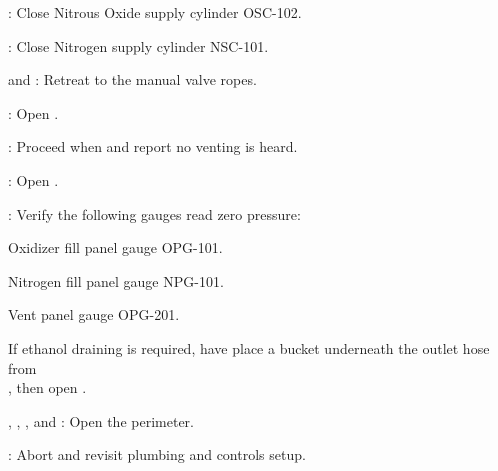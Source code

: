 \begin{checklist}
    \item \primary{}: Close Nitrous Oxide supply cylinder OSC-102. 
    \item \primary{}: Close Nitrogen supply cylinder NSC-101. 
    \item \primary{} and \secondary{}: Retreat to the manual valve ropes. 
    \item \primary{}: Open \moxfill{}.  
    \item \ops{}: Proceed when \primary{} and \secondary{} report no venting is heard.
    \item \primary{}: Open \pdrain{}. 
    \item \primary{}: Verify the following gauges read zero pressure:
    \begin{checklist}[label=$\bullet$]
        \item Oxidizer fill panel gauge OPG-101.
        \item Nitrogen fill panel gauge NPG-101. 
        \item Vent panel gauge OPG-201. 
    \end{checklist}
    \begin{checklist}[label=$\bullet$]
            \item If ethanol draining is required, have \primary{} place a bucket underneath the outlet hose from \\ \phantom{} \hspace{7ex} \fdrain{}, then open \fdrain{}. 
    \end{checklist}
    \item \peri{}, \perii{}, \periii{}, and \periv{}: Open the perimeter. 
    \item \ops{}: Abort and revisit plumbing and controls setup. 
\end{checklist}


\newpage
